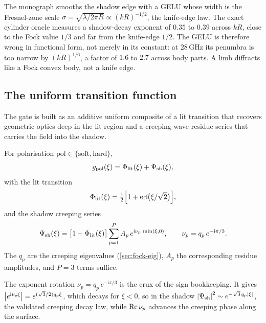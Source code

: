 \begin{remark}\label{rem:gelu-wrong}
The monograph smooths the shadow edge with a GELU whose width is the Fresnel-zone
scale $\sigma=\sqrt{\lambda/2\pi R}\propto(kR)^{-1/2}$, the knife-edge law. The
exact cylinder oracle measures a shadow-decay exponent of $0.35$ to $0.39$ across
$kR$, close to the Fock value $1/3$ and far from the knife-edge $1/2$. The GELU
is therefore wrong in functional form, not merely in its constant: at 28\,GHz its
penumbra is too narrow by $(kR)^{1/6}$, a factor of $1.6$ to $2.7$ across body
parts. A limb diffracts like a Fock convex body, not a knife edge.
\end{remark}

\subsection{The uniform transition function}\label{sec:fock-g}

The gate is built as an additive uniform composite of a lit transition that
recovers geometric optics deep in the lit region and a creeping-wave residue
series that carries the field into the shadow.

\begin{definition}\label{def:fock-g}
For polarisation $\mathrm{pol}\in\{\text{soft},\text{hard}\}$,
\begin{equation}\label{eq:fock-g}
  g_{\mathrm{pol}}(\xi) = \Phi_{\mathrm{lit}}(\xi) + \Psi_{\mathrm{sh}}(\xi),
\end{equation}
with the lit transition
\begin{equation}\label{eq:phi-lit}
  \Philit(\xi) = \half\Bigl[1+\erf\!\bigl(\xi/\sqrt2\bigr)\Bigr],
\end{equation}
and the shadow creeping series
\begin{equation}\label{eq:psi-shadow}
  \Psi_{\mathrm{sh}}(\xi) = \bigl[1-\Phi_{\mathrm{lit}}(\xi)\bigr]\sum_{p=1}^{P}
  A_p\,e^{\mathrm{i}\nu_p\,\min(\xi,0)},
  \qquad \nu_p = q_p\,e^{-\mathrm{i}\pi/3}.
\end{equation}
The $q_p$ are the creeping eigenvalues (\cref{sec:fock-eig}), $A_p$ the
corresponding residue amplitudes, and $P=3$ terms suffice.
\end{definition}

The exponent rotation $\nu_p=q_p\,e^{-\mathrm{i}\pi/3}$ is the crux of the sign
bookkeeping. It gives $\abs{e^{\mathrm{i}\nu_p\xi}} = e^{(\sqrt3/2)q_p\xi}$, which
decays for $\xi<0$, so in the shadow $\abs{\Psi_{\mathrm{sh}}}^2\sim e^{-\sqrt3\,q_p\abs{\xi}}$,
the validated creeping decay law, while $\operatorname{Re}\nu_p$ advances the creeping phase
along the surface.

